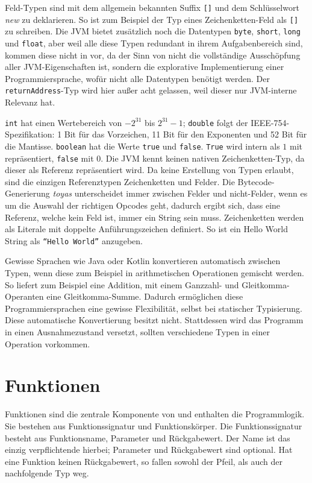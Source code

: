 Feld-Typen sind mit dem allgemein bekannten Suffix \texttt{[]} und dem Schlüsselwort \textit{new} zu deklarieren. So ist zum Beispiel der Typ eines Zeichenketten-Feld als \texttt{[]} zu schreiben. Die JVM bietet zusätzlich noch die Datentypen \texttt{byte}, \texttt{short}, \texttt{long} und \texttt{float}, aber weil alle diese Typen redundant in ihrem Aufgabenbereich sind, kommen diese nicht in \toya vor, da der Sinn von \toya nicht die vollständige Ausschöpfung aller JVM-Eigenschaften ist, sondern die explorative Implementierung einer Programmiersprache, wofür nicht alle Datentypen benötigt werden. Der \texttt{returnAddress}-Typ wird hier außer acht gelassen, weil dieser nur JVM-interne Relevanz hat.

\texttt{int} hat einen Wertebereich von $-2^{31}$ bis $2^{31} - 1$; \texttt{double} folgt der IEEE-754-Spezifikation: 1 Bit für das Vorzeichen, 11 Bit für den Exponenten und 52 Bit für die Mantisse. \texttt{boolean} hat die Werte \texttt{true} und \texttt{false}. \texttt{True} wird intern als $1$ mit repräsentiert, \texttt{false} mit 0. Die JVM kennt keinen nativen Zeichenketten-Typ, da dieser als Referenz repräsentiert wird. Da \toya keine Erstellung von Typen erlaubt, sind die einzigen Referenztypen Zeichenketten und Felder. Die Bytecode-Generierung \textit{toyas} unterscheidet immer zwischen Felder und nicht-Felder, wenn es um die Auswahl der richtigen Opcodes geht, dadurch ergibt sich, dass eine Referenz, welche kein Feld ist, immer ein String sein muss. Zeichenketten werden als Literale mit doppelte Anführungszeichen definiert. So ist ein Hello World String als \texttt{``Hello World''} anzugeben.

Gewisse Sprachen wie Java oder Kotlin konvertieren automatisch zwischen Typen, wenn diese zum Beispiel in arithmetischen Operationen gemischt werden. So liefert zum Beispiel eine Addition, mit einem Ganzzahl- und Gleitkomma-Operanten eine Gleitkomma-Summe. Dadurch ermöglichen diese Programmiersprachen eine gewisse Flexibilität, selbst bei statischer Typisierung. Diese automatische Konvertierung besitzt \toya nicht. Stattdessen wird das Programm in einen Ausnahmezustand versetzt, sollten verschiedene Typen in einer Operation vorkommen.

\section{Funktionen}

Funktionen sind die zentrale Komponente von \toya und enthalten die Programmlogik. Sie bestehen aus Funktionssignatur und Funktionskörper. Die Funktionssignatur besteht aus Funktionsname, Parameter und Rückgabewert. Der Name ist das einzig verpflichtende hierbei; Parameter und Rückgabewert sind optional. Hat eine Funktion keinen Rückgabewert, so fallen sowohl der Pfeil, als auch der nachfolgende Typ weg.


